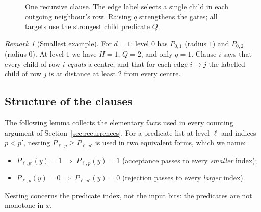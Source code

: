 \documentclass[11pt]{article}
\theoremstyle{definition}
\theoremstyle{remark}
\newtheorem{remark}[theorem]{Remark}
\begin{document}
\begin{figure}[htbp]
\centering
{}
\caption{One recursive clause. The edge label selects a single child in
each outgoing neighbour's row. Raising \(q\) strengthens the gates;
all targets use the strongest child predicate \(Q\).}
\label{fig:clause}
\end{figure}

\begin{remark}[Smallest example]
For \(d=1\): level \(0\) has \(P_{0,1}\) (radius \(1\)) and \(P_{0,2}\)
(radius \(0\)). At level \(1\) we have \(H=1\), \(Q=2\), and only \(q=1\).
Clause \(i\) says that every child of row \(i\) \emph{equals} a centre, and
that for each edge \(i\to j\) the labelled child of row \(j\) is at distance
at least \(2\) from every centre.
\end{remark}

\subsection{Structure of the clauses}

The following lemma collects the elementary facts used in every counting
argument of Section~\ref{sec:recurrences}. For a predicate list at level
\(\ell\) and indices \(p<p'\), nesting \(P_{\ell,p}\ge P_{\ell,p'}\) is used in
two equivalent forms, which we name:
\begin{itemize}[nosep]
\item[(N1)] \(P_{\ell,p'}(y)=1\ \Longrightarrow\ P_{\ell,p}(y)=1\)
 (acceptance passes to every \emph{smaller} index);
\item[(N0)] \(P_{\ell,p}(y)=0\ \Longrightarrow\ P_{\ell,p'}(y)=0\)
 (rejection passes to every \emph{larger} index).
\end{itemize}
Nesting concerns the predicate index, not the input bits: the predicates are
not monotone in \(x\).
\end{document}
